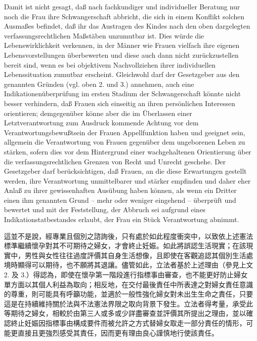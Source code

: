 \documentclass[12pt]{article}
\begin{document}
\begin{sourcepara}[title={原文D.78}]
Damit ist nicht gesagt, daß nach fachkundiger und individueller Beratung nur noch die Frau ihre Schwangerschaft abbricht, die sich in einem Konflikt solchen Ausmaßes befindet, daß ihr das Austragen des Kindes nach den oben dargelegten verfassungsrechtlichen Maßstäben unzumutbar ist. Dies würde die Lebenswirklichkeit verkennen, in der Männer wie Frauen vielfach ihre eigenen Lebensvorstellungen überbewerten und diese auch dann nicht zurückzustellen bereit sind, wenn es bei objektivem Nachvollziehen ihrer individuellen Lebenssituation zumutbar erscheint. Gleichwohl darf der Gesetzgeber aus den genannten Gründen (vgl. oben 2. und 3.) annehmen, auch eine Indikationenüberprüfung im ersten Stadium der Schwangerschaft könnte nicht besser verhindern, daß Frauen sich einseitig an ihren persönlichen Interessen orientieren; demgegenüber könne aber die im Überlassen einer Letztverantwortung zum Ausdruck kommende Achtung vor dem Verantwortungsbewußtsein der Frauen Appellfunktion haben und geeignet sein, allgemein die Verantwortung von Frauen gegenüber dem ungeborenen Leben zu stärken, sofern dies vor dem Hintergrund einer wachgehaltenen Orientierung über die verfassungsrechtlichen Grenzen von Recht und Unrecht geschehe. Der Gesetzgeber darf berücksichtigen, daß Frauen, an die diese Erwartungen gestellt werden, ihre Verantwortung unmittelbarer und stärker empfinden und daher eher Anlaß zu ihrer gewissenhaften Ausübung haben können, als wenn ein Dritter einen ihm genannten Grund -- mehr oder weniger eingehend -- überprüft und bewertet und mit der Feststellung, der Abbruch sei aufgrund eines Indikationstatbestandes erlaubt, der Frau ein Stück Verantwortung abnimmt.
\end{sourcepara}
\begin{transpara}
這並不是說，經專業且個別之諮詢後，只有處於如此程度衝突中，以致依上述憲法標準繼續懷孕對其不可期待之婦女，才會終止妊娠。如此將誤認生活現實；在該現實中，男性與女性往往過度評價其自身生活想像，且即使在客觀追認其個別生活處境時顯得可以期待，也不願將其退讓。儘管如此，立法者基於上述理由（參見上文 2. 及 3.）得認為，即使在懷孕第一階段進行指標事由審查，也不能更好防止婦女單方面以其個人利益為取向；相反地，在交付最後責任中所表達之對婦女責任意識的尊重，則可能具有呼籲功能，並適於一般性強化婦女對未出生生命之責任，只要這是在持續維持關於法與不法憲法界限之取向背景下發生。立法者得考量，承受此等期待之婦女，相較於由第三人或多或少詳盡審查並評價其所提出之理由，並以確認終止妊娠因指標事由構成要件而被允許之方式替婦女取走一部分責任的情形，可能更直接且更強烈感受其責任，因而更有理由良心謹慎地行使該責任。
\end{transpara}
\end{document}
